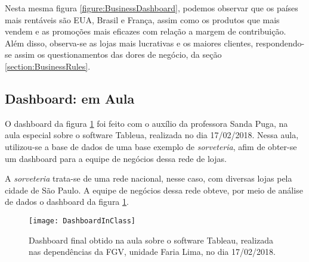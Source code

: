 Nesta mesma figura \ref{figure:BusinessDashboard}, podemos observar que os países mais rentáveis são EUA, Brasil e França, assim como os produtos que mais vendem e as promoções mais eficazes com relação a margem de contribuição. Além disso, observa-se as lojas mais lucrativas e os maiores clientes, respondendo-se assim os questionamentos das dores de negócio, da seção \ref{section:BusinessRules}.

\subsection{Dashboard: em Aula}

O dashboard da figura \ref{figure:TableauDashboardInClass} foi feito com o auxílio da professora Sanda Puga, na aula especial sobre o software Tableua\texttrademark{}, realizada no dia 17/02/2018. Nessa aula, utilizou-se a base de dados de uma base exemplo de \emph{sorveteria}, afim de obter-se um dashboard para a equipe de negócios dessa rede de lojas.

A \emph{sorveteria} trata-se de uma rede nacional, nesse caso, com diversas lojas pela cidade de São Paulo. A equipe de negócios dessa rede obteve, por meio de análise de dados o dashboard da figura \ref{figure:TableauDashboardInClass}.

\begin{center}
\begin{figure}[h]
\begin{centering}
\texttt{[image: DashboardInClass]}
\par\end{centering}
  \caption{\label{figure:TableauDashboardInClass}Dashboard final obtido na aula sobre o software Tableau\texttrademark{}, realizada nas dependências da FGV, unidade Faria Lima, no dia 17/02/2018.}
\end{figure}
\vspace*{-40pt}
\end{center}

